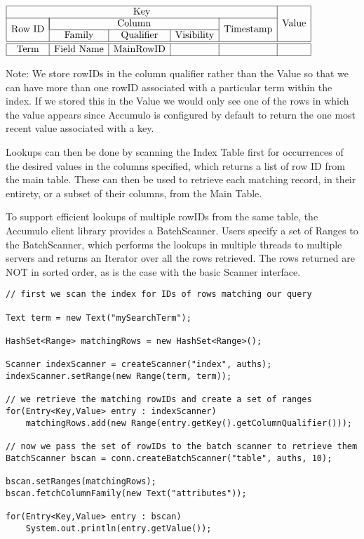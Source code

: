 \begin{center}
$\begin{array}{|c|c|c|c|c|c|} \hline
\multicolumn{5}{|c|}{\mbox{Key}} & \multirow{3}{*}{\mbox{Value}}\\ \cline{1-5}
\multirow{2}{*}{\mbox{Row ID}}& \multicolumn{3}{|c|}{\mbox{Column}} & \multirow{2}{*}{\mbox{Timestamp}} & \\ \cline{2-4}
& \mbox{Family} & \mbox{Qualifier} & \mbox{Visibility} & & \\ \hline \hline
\mbox{Term} & \mbox{Field Name} & \mbox{MainRowID} & & &\\ \hline
\end{array}$
\end{center}

Note: We store rowIDs in the column qualifier rather than the Value so that we can
have more than one rowID associated with a particular term within the index. If we
stored this in the Value we would only see one of the rows in which the value
appears since Accumulo is configured by default to return the one most recent
value associated with a key.

Lookups can then be done by scanning the Index Table first for occurrences of the
desired values in the columns specified, which returns a list of row ID from the main
table. These can then be used to retrieve each matching record, in their entirety, or a
subset of their columns, from the Main Table.

To support efficient lookups of multiple rowIDs from the same table, the Accumulo
client library provides a BatchScanner. Users specify a set of Ranges to the
BatchScanner, which performs the lookups in multiple threads to multiple servers
and returns an Iterator over all the rows retrieved. The rows returned are NOT in
sorted order, as is the case with the basic Scanner interface.

\begingroup\fontsize{8pt}{8pt}\selectfont\begin{verbatim}
// first we scan the index for IDs of rows matching our query

Text term = new Text("mySearchTerm");

HashSet<Range> matchingRows = new HashSet<Range>();

Scanner indexScanner = createScanner("index", auths);
indexScanner.setRange(new Range(term, term));

// we retrieve the matching rowIDs and create a set of ranges
for(Entry<Key,Value> entry : indexScanner)
    matchingRows.add(new Range(entry.getKey().getColumnQualifier()));

// now we pass the set of rowIDs to the batch scanner to retrieve them
BatchScanner bscan = conn.createBatchScanner("table", auths, 10);

bscan.setRanges(matchingRows);
bscan.fetchColumnFamily(new Text("attributes"));

for(Entry<Key,Value> entry : bscan)
    System.out.println(entry.getValue());
\end{verbatim}\endgroup


